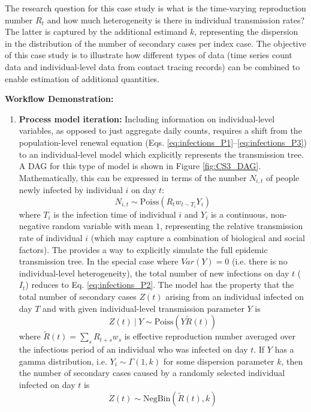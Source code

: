 \documentclass{article}
\begin{document}
The research question for this case study is what is the time-varying reproduction number $R_t$ and how much heterogeneity is there in individual transmission rates? The latter is captured by the additional estimand $k$, representing the dispersion in the distribution of the number of secondary cases per index case. The objective of this case study is to illustrate how different types of data (time series count data and individual-level data from contact tracing records) can be combined to enable estimation of additional quantities. 


\textbf{Workflow Demonstration:}
\begin{enumerate}
    \item \textbf{Process model iteration:} Including information on individual-level variables, as opposed to just aggregate daily counts, requires a shift from the population-level renewal equation (Eqs. \eqref{eq:infections_P1}--\eqref{eq:infections_P3}) to an individual-level model which explicitly represents the transmission tree. A DAG for this type of model is shown in Figure \ref{fig:CS3_DAG}. Mathematically, this can be expressed in terms of the number $N_{i,t}$ of people newly infected by individual $i$ on day $t$:
    \begin{equation} \label{eq:individual_level}
    N_{i,t} \sim \mathrm{Poiss} \left( R_t w_{t-T_i} Y_i\right)
    \end{equation}
    where $T_i$ is the infection time of individual $i$ and $Y_i$ is a continuous, non-negative random variable with mean $1$, representing the relative transmission rate of individual $i$ (which may capture a combination of biological and social factors). The provides a way to explicitly simulate the full epidemic transmission tree.  In the special case where $Var(Y)=0$ (i.e. there is no individual-level heterogeneity), the total number of new infections on day $t$ ($I_t$) reduces to Eq. \eqref{eq:infections_P2}. The model has the property that the total number of secondary cases $Z(t)$ arising from an individual infected on day $T$ and with given individual-level transmission parameter $Y$ is
    \begin{equation}
       Z(t) \ | \ Y \sim \mathrm{Poiss}\left( Y \tilde{R}(t)\right)
    \end{equation}
    where $\tilde{R}(t)= \sum_s R_{t+s} w_s$ is effective reproduction number averaged over the infectious period of an individual who was infected on day $t$. If $Y$ has a gamma distribution, i.e. $Y_i\sim \Gamma(1,k)$ for some dispersion parameter $k$, then the number of secondary cases caused by a randomly selected individual infected on day $t$ is
     \begin{equation} \label{eq:offspring_dist}
        Z(t) \sim \mathrm{NegBin}\left( \tilde{R}(t), k\right)
    \end{equation}   


\end{enumerate}
\end{document}
